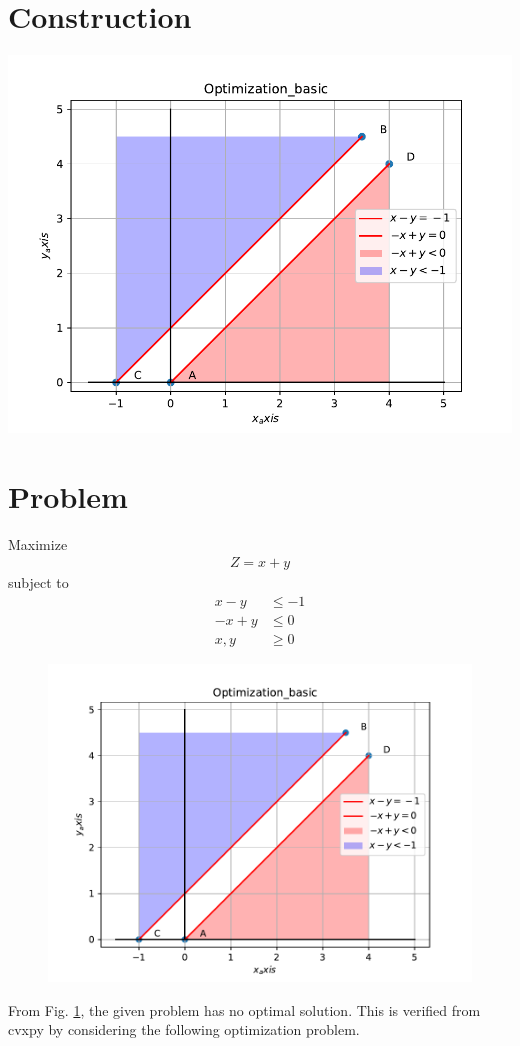 \documentclass[10pt, a4paper]{article}
\title{\mytitle}
\author{\myauthor\hspace{1em}\\\contact\\FWC22012\hspace{6.5em}IITH\hspace{0.5em}\mymodule\hspace{6em}ASSIGN-8}
\date{}
\begin{document}
	\maketitle
	\tableofcontents

\section{Construction}
\includegraphics[scale=0.5]{fig.pdf}

\section{Problem}
\fi
Maximize 
\begin{align}
Z = x+y 
\end{align}
subject to
\begin{align}
 x - y &\le -1
	\\
	-x+y&\le0 
	\\
	x,y &\ge 0
\end{align}
\solution 
	\begin{figure}[!ht]
		\centering
		\includegraphics[width=\columnwidth]{12/12/1/10/figs/fig.pdf}
		\caption{}
		\label{fig:12/12/1/10}
  	\end{figure}
	From Fig. 
		\ref{fig:12/12/1/10},
		the given problem has no optimal solution.  This is verified from cvxpy by considering the following optimization problem.
	\iffalse
\end{document}
